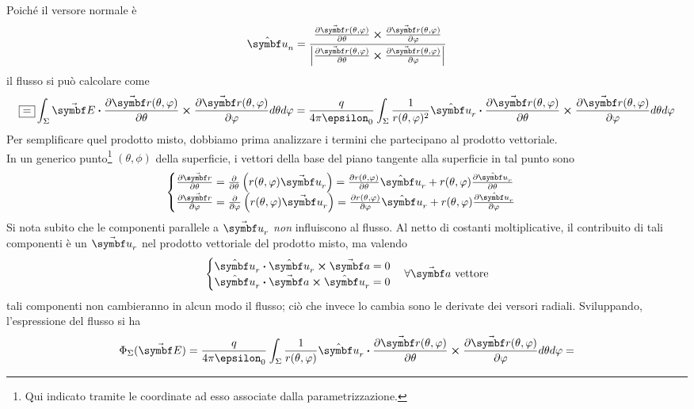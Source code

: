 \begin{demonstration}
	Poiché il versore normale è
	\begin{equation*}
		\vbh{u}_n=\frac{\pdv{\vba{r}(\theta,\phi)}{\theta}\cross\pdv{\vba{r}(\theta,\phi)}{\phi}}{\abs{\pdv{\vba{r}(\theta,\phi)}{\theta}\cross\pdv{\vba{r}(\theta,\phi)}{\phi}}}
	\end{equation*}
	il flusso si può calcolare come
	\begin{equation*}
		\squarequal\int_{\Sigma}\vba{E}\vdot\pdv{\vba{r}(\theta,\phi)}{\theta}\cross\pdv{\vba{r}(\theta,\phi)}{\phi} d\theta d\phi=\frac{q}{4\pi\epsilon_0}\int_{\Sigma}\frac{1}{r(\theta,\phi)^2}\vbh{u}_r\vdot \pdv{\vba{r}(\theta,\phi)}{\theta}\cross\pdv{\vba{r}(\theta,\phi)}{\phi} d\theta d\phi
	\end{equation*}
	Per semplificare quel prodotto misto, dobbiamo prima analizzare i termini che partecipano al prodotto vettoriale.\\
	In un generico punto\footnote{Qui indicato tramite le coordinate ad esso associate dalla parametrizzazione.} $\left(\theta,\phi\right)$ della superficie, i vettori della base del piano tangente alla superficie in tal punto sono
	\begin{equation*}
		\begin{cases}
			\pdv{\vba{r}}{\theta}=\pdv{\theta}\left(r(\theta,\phi)\vba{u}_r\right)=\pdv{r(\theta,\phi)}{\theta}\vbh{u}_r+r(\theta,\phi)\pdv{\vbh{u}_r}{\theta}\\
			\pdv{\vba{r}}{\phi}=\pdv{\phi}\left(r(\theta,\phi)\vba{u}_r\right)=\pdv{r(\theta,\phi)}{\phi}\vbh{u}_r+r(\theta,\phi)\pdv{\vbh{u}_r}{\phi}\\
		\end{cases}
	\end{equation*}
	Si nota subito che  le componenti parallele a $\vba{u}_r$ \textit{non} influiscono al flusso. Al netto di costanti moltiplicative, il contribuito di tali componenti è un $\vba{u}_r$ nel prodotto vettoriale del prodotto misto, ma valendo
\begin{equation*}
	\begin{cases}
		\vbh{u}_r\vdot\vbh{u}_r\cross\vba{a}=0\\
		\vbh{u}_r\vdot\vba{a}\cross\vbh{u}_r=0
	\end{cases}\forall \vba{a}\text{ vettore}
\end{equation*}
tali componenti non cambieranno in alcun modo il flusso; ciò che invece lo cambia sono le derivate dei versori radiali. Sviluppando, l'espressione del flusso si ha
\begin{align*}
	\Phi_{\Sigma}(\vba{E})&=\frac{q}{4\pi\epsilon_0}\int_{\Sigma}\frac{1}{r(\theta,\phi)}\vbh{u}_r\vdot \pdv{\vba{r}(\theta,\phi)}{\theta}\cross\pdv{\vba{r}(\theta,\phi)}{\phi} d\theta d\phi=\\

\end{align*}
\end{demonstration}
